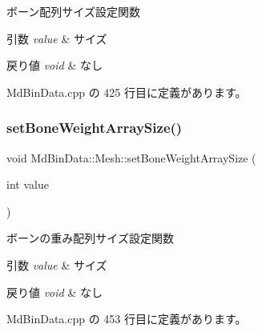 ボーン配列サイズ設定関数 


\begin{DoxyParams}{引数}
{\em value} & サイズ \\
\hline
\end{DoxyParams}

\begin{DoxyRetVals}{戻り値}
{\em void} & なし \\
\hline
\end{DoxyRetVals}


 Md\+Bin\+Data.\+cpp の 425 行目に定義があります。

\mbox{\label{class_md_bin_data_1_1_mesh_a1b779f82008537dd14cfac4b8819620a}} 
\subsubsection{\texorpdfstring{set\+Bone\+Weight\+Array\+Size()}{setBoneWeightArraySize()}}
{\footnotesize\ttfamily void Md\+Bin\+Data\+::\+Mesh\+::set\+Bone\+Weight\+Array\+Size (\begin{DoxyParamCaption}\item[{int}]{value }\end{DoxyParamCaption})}



ボーンの重み配列サイズ設定関数 


\begin{DoxyParams}{引数}
{\em value} & サイズ \\
\hline
\end{DoxyParams}

\begin{DoxyRetVals}{戻り値}
{\em void} & なし \\
\hline
\end{DoxyRetVals}


 Md\+Bin\+Data.\+cpp の 453 行目に定義があります。

\mbox{\label{class_md_bin_data_1_1_mesh_a122f9fe79f8a349697a87a3694d9969c}} 
